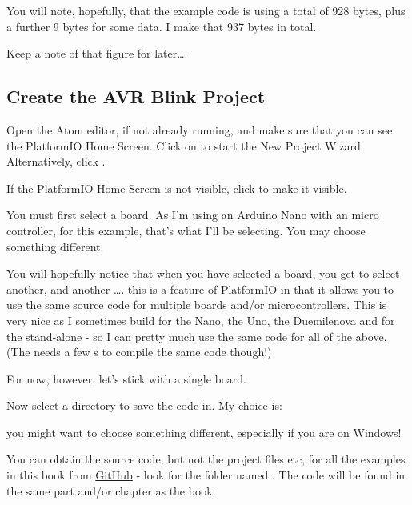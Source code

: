 You will note, hopefully, that the example code is using a total of 928 bytes, plus a further 9 bytes for some data. I make that 937 bytes in total.

Keep a note of that figure for later\ldots{}.

\subsection{Create the AVR Blink Project}\label{create-the-avr-blink-project}

Open the Atom editor, if not already running, and make sure that you can see the PlatformIO Home Screen. Click on  to start the New Project Wizard. Alternatively, click .

If the PlatformIO Home Screen is not visible, click  to make it visible.

You must first select a board. As I'm using an Arduino Nano with an  micro controller, for this example, that's what I'll be selecting. You may choose something different.

You will hopefully notice that when you have selected a board, you get to select another, and another \ldots{}. this is a feature of PlatformIO in that it allows you to use the same source code for multiple boards and/or microcontrollers. This is very nice as I sometimes build for the Nano, the Uno, the Duemilenova and for the stand-alone  - so I can pretty much use the same code for all of the above. (The  needs a few s to compile the same code though!)

For now, however, let's stick with a single board.

Now select a directory to save the code in. My choice is:


you might want to choose something different, especially if you are on
Windows!

\begin{note}
You can obtain the source code, but not the  project files etc, for all the examples in this book from \href{https://github.com/NormanDunbar/AVRBook}{GitHub} - look for the folder named . The code will be found in the same part and/or chapter as the book.
\end{note}

